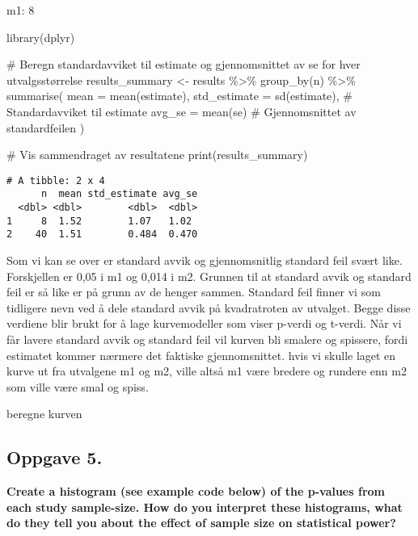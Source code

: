 \documentclass[
  letterpaper,
  DIV=11,
  numbers=noendperiod]{scrreprt}
\newenvironment{Shaded}{\begin{snugshade}}{\end{snugshade}}
\newcommand{\AttributeTok}[1]{\textcolor[rgb]{0.40,0.45,0.13}{#1}}
\newcommand{\CommentTok}[1]{\textcolor[rgb]{0.37,0.37,0.37}{#1}}
\newcommand{\FunctionTok}[1]{\textcolor[rgb]{0.28,0.35,0.67}{#1}}
\newcommand{\NormalTok}[1]{\textcolor[rgb]{0.00,0.23,0.31}{#1}}
\newcommand{\OtherTok}[1]{\textcolor[rgb]{0.00,0.23,0.31}{#1}}
\newcommand{\SpecialCharTok}[1]{\textcolor[rgb]{0.37,0.37,0.37}{#1}}
\begin{document}
m1: 8

\begin{Shaded}
\begin{Highlighting}[]
\FunctionTok{library}\NormalTok{(dplyr)}

\CommentTok{\# Beregn standardavviket til estimate og gjennomsnittet av se for hver utvalgsstørrelse}
\NormalTok{results\_summary }\OtherTok{\textless{}{-}}\NormalTok{ results }\SpecialCharTok{\%\textgreater{}\%}
  \FunctionTok{group\_by}\NormalTok{(n) }\SpecialCharTok{\%\textgreater{}\%}
  \FunctionTok{summarise}\NormalTok{(}
    \AttributeTok{mean =} \FunctionTok{mean}\NormalTok{(estimate),}
    \AttributeTok{std\_estimate =} \FunctionTok{sd}\NormalTok{(estimate),  }\CommentTok{\# Standardavviket til estimate}
    \AttributeTok{avg\_se =} \FunctionTok{mean}\NormalTok{(se)             }\CommentTok{\# Gjennomsnittet av standardfeilen}
\NormalTok{  )}

\CommentTok{\# Vis sammendraget av resultatene}
\FunctionTok{print}\NormalTok{(results\_summary)}
\end{Highlighting}
\end{Shaded}

\begin{verbatim}
# A tibble: 2 x 4
      n  mean std_estimate avg_se
  <dbl> <dbl>        <dbl>  <dbl>
1     8  1.52        1.07   1.02 
2    40  1.51        0.484  0.470
\end{verbatim}

Som vi kan se over er standard avvik og gjennomsnitlig standard feil
svært like. Forskjellen er 0,05 i m1 og 0,014 i m2. Grunnen til at
standard avvik og standard feil er så like er på grunn av de henger
sammen. Standard feil finner vi som tidligere nevn ved å dele standard
avvik på kvadratroten av utvalget. Begge disse verdiene blir brukt for å
lage kurvemodeller som viser p-verdi og t-verdi. Når vi får lavere
standard avvik og standard feil vil kurven bli smalere og spissere,
fordi estimatet kommer nærmere det faktiske gjennomsnittet. hvis vi
skulle laget en kurve ut fra utvalgene m1 og m2, ville altså m1 være
bredere og rundere enn m2 som ville være smal og spiss.

beregne kurven

\subsection{Oppgave 5.}\label{oppgave-5.}

\textbf{Create a histogram (see example code below) of the p-values from
each study sample-size. How do you interpret these histograms, what do
they tell you about the effect of sample size on statistical power?}
\end{document}
